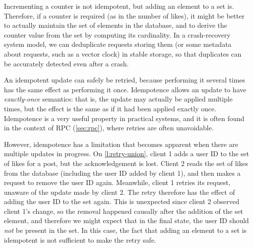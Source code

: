 Incrementing a counter is not idempotent, but adding an element to a set is.
Therefore, if a counter is required (as in the number of likes), it might be better to actually maintain the set of elements in the database, and to derive the counter value from the set by computing its cardinality.
In a crash-recovery system model, we can deduplicate requests storing them (or some metadata about requests, such as a vector clock) in stable storage, so that duplicates can be accurately detected even after a crash.

An idempotent update can safely be retried, because performing it several times has the same effect as performing it once.
Idempotence allows an update to have \emph{exactly-once} semantics: that is, the update may actually be applied multiple times, but the effect is the same as if it had been applied exactly once.
Idempotence is a very useful property in practical systems, and it is often found in the context of RPC (\autoref{sec:rpc}), where retries are often unavoidable.


However, idempotence has a limitation that becomes apparent when there are multiple updates in progress.
On \autoref{l:retry-union}, client 1 adds a user ID to the set of likes for a post, but the acknowledgement is lost.
Client 2 reads the set of likes from the database (including the user ID added by client 1), and then makes a request to remove the user ID again.
Meanwhile, client 1 retries its request, unaware of the update made by client 2.
The retry therefore has the effect of adding the user ID to the set again.
This is unexpected since client 2 observed client 1's change, so the removal happened causally after the addition of the set element, and therefore we might expect that in the final state, the user ID should \emph{not} be present in the set.
In this case, the fact that adding an element to a set is idempotent is not sufficient to make the retry safe.

